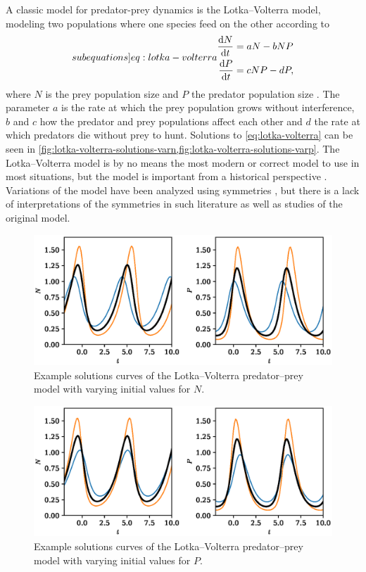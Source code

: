 A classic model for predator-prey dynamics is the Lotka--Volterra model, modeling two populations where one species feed on the other according to
\begin{subequations} \label[subequations]{eq:lotka-volterra}
  \begin{align}
    \diff{N}{t} &= a N - b N P\\
    \diff{P}{t} &= c N P - d P,
  \end{align}
\end{subequations}
where \(N\) is the prey population size and \(P\) the predator population size \cite{lotka1925elements,volterra1928variations}.
The parameter \(a\) is the rate at which the prey population grows without interference, \(b\) and \(c\) how the predator and prey populations affect each other and \(d\) the rate at which predators die without prey to hunt.
Solutions to \cref{eq:lotka-volterra} can be seen in \cref{fig:lotka-volterra-solutions-varn,fig:lotka-volterra-solutions-varp}.
The Lotka--Volterra model is by no means the most modern or correct model to use in most situations, but the model is important from a historical perspective \cite{berryman1992orgins}.
Variations of the model have been analyzed using symmetries \cite{almeida1995lie,cherniha2004diffusive}, but there is a lack of interpretations of the symmetries in such literature as well as studies of the original model.
\begin{figure}
  \centering
  \includegraphics[width=.96\textwidth]{images/lotka-volterra-solutions-varn}
  \caption{Example solutions curves of the Lotka--Volterra predator--prey model with varying initial values for \(N\).}
  \label{fig:lotka-volterra-solutions-varn}
\end{figure}
\begin{figure}
  \centering
  \includegraphics[width=.96\textwidth]{images/lotka-volterra-solutions-varp}
  \caption{Example solutions curves of the Lotka--Volterra predator--prey model with varying initial values for \(P\).}
  \label{fig:lotka-volterra-solutions-varp}
\end{figure}

